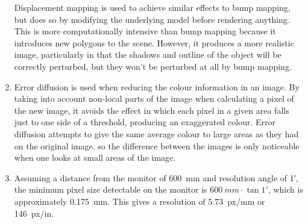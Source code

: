 \documentclass{article}
\begin{document}
\begin{enumerate}
    Displacement mapping is used to achieve similar effects to bump mapping, but does so by modifying the underlying model before rendering anything. This is more computationally intensive than bump mapping because it introduces new polygons to the scene. However, it produces a more realistic image, particularly in that the shadows and outline of the object will be correctly perturbed, but they won't be perturbed at all by bump mapping.
  \item Error diffusion is used when reducing the colour information in an image. By taking into account non-local parts of the image when calculating a pixel of the new image, it avoids the effect in which each pixel in a given area falls just to one side of a threshold, producing an exaggerated colour. Error diffusion attempts to give the same average colour to large areas as they had on the original image, so the difference between the images is only noticeable when one looks at small areas of the image.
  \item Assuming a distance from the monitor of \SI{600}{mm} and resolution angle of \ang{;1;}, the minimum pixel size detectable on the monitor is $\SI{600}{mm} \cdot \tan \ang{;1;}$, which is approximately \SI{0.175}{mm}. This gives a resolution of \SI{5.73}{px/mm} or \SI{146}{px/in}.
\end{enumerate}
\end{document}

